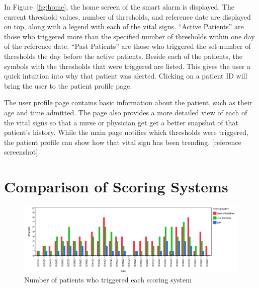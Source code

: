\documentclass{sig-alternate}
\begin{document}
In  Figure~\ref{fig:home}, the home screen of the smart alarm is displayed.  The current threshold values, number of thresholds, and reference date are displayed on top, along with a legend with each of the vital signs.  ``Active Patients'' are those who triggered more than the specified number of thresholds within one day of the reference date. ``Past Patients'' are those who triggered the set number of thresholds the day before the active patients.  Beside each of the patients, the symbols with the thresholds that were triggered are listed.  This gives the user a quick intuition into why that patient was alerted.  Clicking on a patient ID will bring the user to the patient profile page.

The user profile page contains basic information about the patient, such as their age and time admitted.  The page also provides a more detailed view of each of the vital signs so that a nurse or physician get get a better snapshot of that patient's history.  While the main page notifies which thresholds were triggered, the patient profile can show how that vital sign has been trending. [reference screenshot]

\vspace{10pt}
\section{Comparison of Scoring Systems}
\vspace{10pt}
\label{sec:scoring}

\begin{figure}
	\begin{center}
		\includegraphics[width=1.0\linewidth]{ScoringComparison.png}
	\end{center}
	\caption{Number of patients who triggered each scoring system}
	\label{fig:comparison}
\end{figure}
\end{document}
